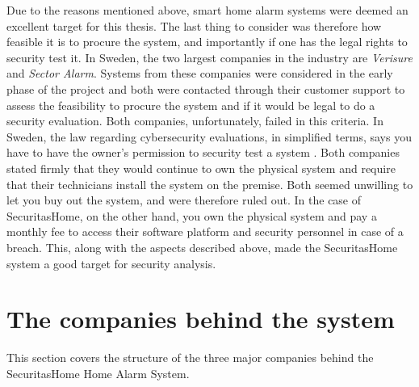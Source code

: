 Due to the reasons mentioned above, smart home alarm systems were deemed an excellent target for this thesis. The last thing to consider was therefore how feasible it is to procure the system, and importantly if one has the legal rights to security test it. In Sweden, the two largest companies in the industry are \textit{Verisure} and \textit{Sector Alarm}. Systems from these companies were considered in the early phase of the project and both were contacted through their customer support to assess the feasibility to procure the system and if it would be legal to do a security evaluation. Both companies, unfortunately, failed in this criteria. In Sweden, the law regarding cybersecurity evaluations, in simplified terms, says you have to have the owner's permission to security test a system \cite{brottsbalken-it-brott}. Both companies stated firmly that they would continue to own the physical system and require that their technicians install the system on the premise. Both seemed unwilling to let you buy out the system, and were therefore ruled out. In the case of SecuritasHome, on the other hand, you own the physical system and pay a monthly fee to access their software platform and security personnel in case of a breach. This, along with the aspects described above, made the SecuritasHome system a good target for security analysis.

\section{The companies behind the system} \label{ch:system:companies}
This section covers the structure of the three major companies behind the SecuritasHome Home Alarm System.

